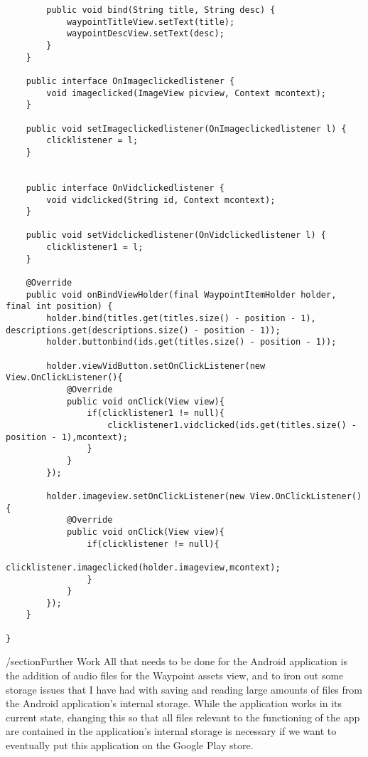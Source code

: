 \documentclass[letterpaper, 10pt,titlepage]{article}
\begin{document}
\begin{verbatim}
        public void bind(String title, String desc) {
            waypointTitleView.setText(title);
            waypointDescView.setText(desc);
        }
    }
    
    public interface OnImageclickedlistener {
        void imageclicked(ImageView picview, Context mcontext);
    }

    public void setImageclickedlistener(OnImageclickedlistener l) {
        clicklistener = l;
    }


    public interface OnVidclickedlistener {
        void vidclicked(String id, Context mcontext);
    }

    public void setVidclickedlistener(OnVidclickedlistener l) {
        clicklistener1 = l;
    }

    @Override
    public void onBindViewHolder(final WaypointItemHolder holder, final int position) {
        holder.bind(titles.get(titles.size() - position - 1), descriptions.get(descriptions.size() - position - 1));
        holder.buttonbind(ids.get(titles.size() - position - 1));

        holder.viewVidButton.setOnClickListener(new View.OnClickListener(){
            @Override
            public void onClick(View view){
                if(clicklistener1 != null){
                    clicklistener1.vidclicked(ids.get(titles.size() - position - 1),mcontext);
                }
            }
        });

        holder.imageview.setOnClickListener(new View.OnClickListener(){
            @Override
            public void onClick(View view){
                if(clicklistener != null){
                    clicklistener.imageclicked(holder.imageview,mcontext);
                }
            }
        });
    }

}
\end{verbatim}

/section{Further Work}
All that needs to be done for the Android application is the addition of audio files for the Waypoint assets view, and to iron out some storage issues that I have had with saving and reading large amounts of files from the Android application's internal storage. While the application works in its current state, changing this so that all files relevant to the functioning of the app are contained in the application's internal storage is necessary if we want to eventually put this application on the Google Play store.



\vspace{0.5cm}
\end{document}
